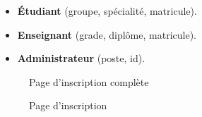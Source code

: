 \documentclass[12pt]{report}
\begin{document}
\begin{itemize}
  \item \textbf{Étudiant} (groupe, spécialité, matricule).
  \item \textbf{Enseignant} (grade, diplôme, matricule).
  \item \textbf{Administrateur} (poste, id).
\end{itemize}

\begin{figure}[h]
\centering
\caption{Page d'inscription complète}
\end{figure}

\newpage

\begin{figure}[h]
\centering
\caption{Page d'inscription}
\end{figure}
\end{document}
